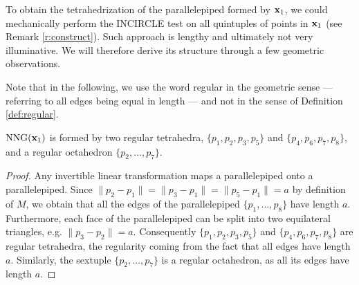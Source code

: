To obtain the tetrahedrization of the parallelepiped formed by ${\mathbf{x}}_1$, we could mechanically perform the INCIRCLE test on all quintuples of points in ${\mathbf{x}}_1$ (see Remark \ref{r:construct}). Such approach is lengthy and ultimately not very illuminative. We will therefore derive its structure through a few geometric observations.

Note that in the following, we use the word regular in the geometric sense --- referring to all edges being equal in length --- and not in the sense of Definition \ref{def:regular}.
\begin{lemma}
	$\mathrm{NNG}({\mathbf{x}}_1)$ is formed by two regular tetrahedra, $\{p_1,p_2,p_3,p_5\}$ and $\{p_4,p_6,p_7,p_8\}$, and a regular octahedron $\{p_2,\dots,p_7\}$.
\end{lemma}
\begin{proof}
	Any invertible linear transformation maps a parallelepiped onto a parallelepiped. Since $\|p_2 - p_1\| = \|p_3-p_1\| = \|p_5-p_1\|=a$ by definition of $M$, we obtain that all the edges of the parallelepiped $\{p_1,\dots,p_8\}$ have length $a$. Furthermore, each face of the parallelepiped can be split into two equilateral triangles, e.g. $\|p_3-p_2\|=a$. Consequently $\{p_1,p_2,p_3,p_5\}$ and $\{p_4,p_6,p_7,p_8\}$ are regular tetrahedra, the regularity coming from the fact that all edges have length $a$. Similarly, the sextuple $\{p_2,\dots,p_7\}$ is a regular octahedron, as all its edges have length $a$.
\end{proof}



